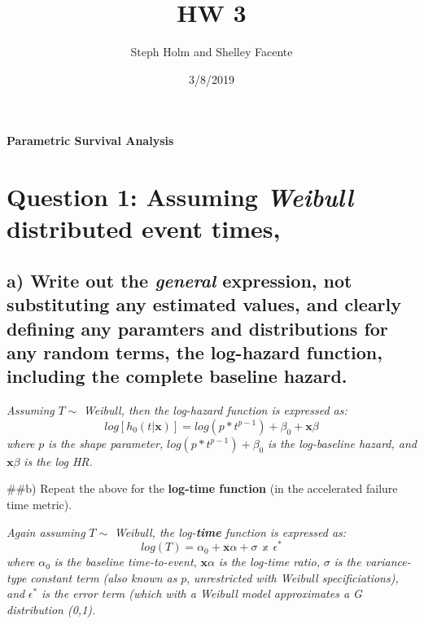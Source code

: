 \documentclass[]{article}
\title{HW 3}
\author{Steph Holm and Shelley Facente}
\date{3/8/2019}
\begin{document}
\maketitle

\textbf{Parametric Survival Analysis}

\section{\texorpdfstring{Question 1: Assuming \emph{Weibull} distributed
event
times,}{Question 1: Assuming Weibull distributed event times,}}\label{question-1-assuming-weibull-distributed-event-times}

\subsection{\texorpdfstring{a) Write out the \emph{general} expression,
not substituting any estimated values, and clearly defining any
paramters and distributions for any random terms, the \textbf{log-hazard
function}, including the complete baseline
hazard.}{a) Write out the general expression, not substituting any estimated values, and clearly defining any paramters and distributions for any random terms, the log-hazard function, including the complete baseline hazard.}}\label{a-write-out-the-general-expression-not-substituting-any-estimated-values-and-clearly-defining-any-paramters-and-distributions-for-any-random-terms-the-log-hazard-function-including-the-complete-baseline-hazard.}

\emph{Assuming} \(T \sim\) \emph{Weibull, then the log-hazard function
is expressed as:} \[
log[h_0(t|\boldsymbol{x})] = log(p * t^{p-1}) + \beta_0 +\boldsymbol{x}\beta
\] \emph{where} \(p\) \emph{is the shape parameter,}
\(log(p * t^{p-1}) + \beta_0\) \emph{is the log-baseline hazard, and}
\(\boldsymbol{x}\beta\) \emph{is the log HR.}

\vspace{6pt} \#\#b) Repeat the above for the \textbf{log-time function}
(in the accelerated failure time metric).

\emph{Again assuming} \(T \sim\) \emph{Weibull, the log-\textbf{time}
function is expressed as:} \[
log(T) = \alpha_0 + \boldsymbol{x}\alpha + \sigma \ \  \mathbb{x} \ \  \epsilon^\ast
\] \emph{where} \(\alpha_0\) \emph{is the baseline time-to-event,}
\(\boldsymbol{x}\alpha\) \emph{is the log-time ratio,} \(\sigma\)
\emph{is the variance-type constant term (also known as} \(p\),
\emph{unrestricted with Weibull specificiations), and} \(\epsilon^\ast\)
\emph{is the error term (which with a Weibull model approximates a G
distribution (0,1).}
\end{document}
